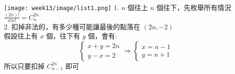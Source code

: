 \texttt{[image: week13/image/list1.png]}
1. $n$ 個往上 $n$ 個往下，先枚舉所有情況 $\frac{(2n)!}{n!n!} = C_{n}^{2n}$\\
2. 扣掉非法的，有多少種可能讓最後的點落在 $(2n, -2)$\\
假設往上有 $x$ 個，往下有 $y$ 個，會有:
$$
\begin{cases}
x + y = 2n\\
y - x = 2
\end{cases}
\Rightarrow
\begin{cases}
x = n - 1\\
y = n + 1
\end{cases}
$$
所以只要扣掉 $C_{n-1}^{2n}$ 即可